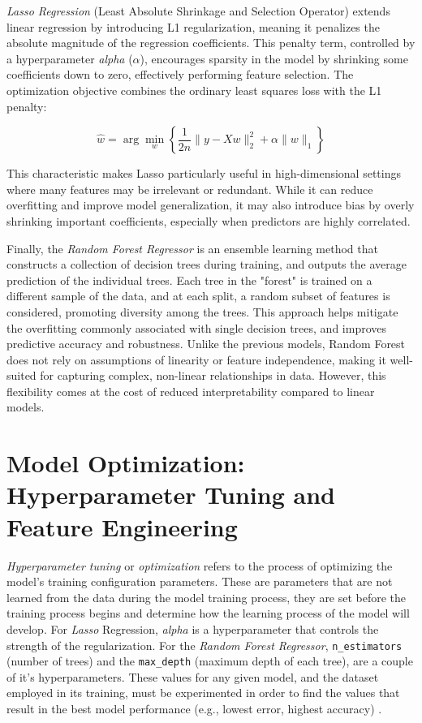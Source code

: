 \documentclass[12pt]{report} %
\begin{document}
\textit{Lasso Regression} \cite{lasso_regression} (Least Absolute Shrinkage and Selection Operator) extends linear regression by introducing L1 regularization, meaning it penalizes the absolute magnitude of the regression coefficients. This penalty term, controlled by a hyperparameter \textit{alpha} ($\alpha$), encourages sparsity in the model by shrinking some coefficients down to zero, effectively performing feature selection. The optimization objective combines the ordinary least squares loss with the L1 penalty:

\begin{equation*}
\hat{w} = \arg\min_{w} \left\{ \frac{1}{2n} \| y - Xw \|_2^2 + \alpha \| w \|_1 \right\}
\end{equation*}

This characteristic makes Lasso particularly useful in high-dimensional settings where many features may be irrelevant or redundant. While it can reduce overfitting and improve model generalization, it may also introduce bias by overly shrinking important coefficients, especially when predictors are highly correlated.

Finally, the \textit{Random Forest Regressor} \cite{random_forest_regressor} is an ensemble learning method that constructs a collection of decision trees during training, and outputs the average prediction of the individual trees. Each tree in the "forest" is trained on a different sample of the data, and at each split, a random subset of features is considered, promoting diversity among the trees. This approach helps mitigate the overfitting commonly associated with single decision trees, and improves predictive accuracy and robustness. Unlike the previous models, Random Forest does not rely on assumptions of linearity or feature independence, making it well-suited for capturing complex, non-linear relationships in data. However, this flexibility comes at the cost of reduced interpretability compared to linear models.


\section{Model Optimization: Hyperparameter Tuning and Feature Engineering}

\textit{Hyperparameter tuning} or \textit{optimization} refers to the process of optimizing the model's training configuration parameters. These are parameters that are not learned from the data during the model training process, they are set before the training process begins and determine how the learning process of the model will develop. For \textit{Lasso} Regression, \textit{alpha} is a hyperparameter that controls the strength of the regularization. For the \textit{Random Forest Regressor}, \verb|n_estimators| (number of trees) and the \verb|max_depth| (maximum depth of each tree), are a couple of it's hyperparameters. These values for any given model, and the dataset employed in its training, must be experimented in order to find the values that result in the best model performance (e.g., lowest error, highest accuracy) \cite{ml-bishop}.
\end{document}
